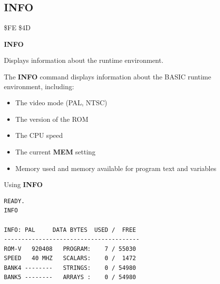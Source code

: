 
\newpage
\subsection{INFO}
\begin{description}[leftmargin=2cm,style=nextline]
\item [Token:]    \$FE \$4D

\item [Format:]   {\bf INFO}

\item [Usage:]    Displays information about the runtime environment.

\item [Remarks:]  The {\bf INFO} command displays information about the BASIC runtime environment, including:

                  \begin{itemize}
                     \item The video mode (PAL, NTSC)
                     \item The version of the ROM
                     \item The CPU speed
                     \item The current {\bf MEM} setting
                     \item Memory used and memory available for program text and variables
                  \end{itemize}

\item [Example:]  Using {\bf INFO}

\begin{tcolorbox}[colback=black,coltext=white]
\verbatimfont{\codefont}
\begin{verbatim}
READY.
INFO

INFO: PAL     DATA BYTES  USED /  FREE
---------------------------------------
ROM-V   920408   PROGRAM:    7 / 55030
SPEED   40 MHZ   SCALARS:    0 /  1472
BANK4 --------   STRINGS:    0 / 54980
BANK5 --------   ARRAYS :    0 / 54980
\end{verbatim}
\end{tcolorbox}
\end{description}


\newpage
